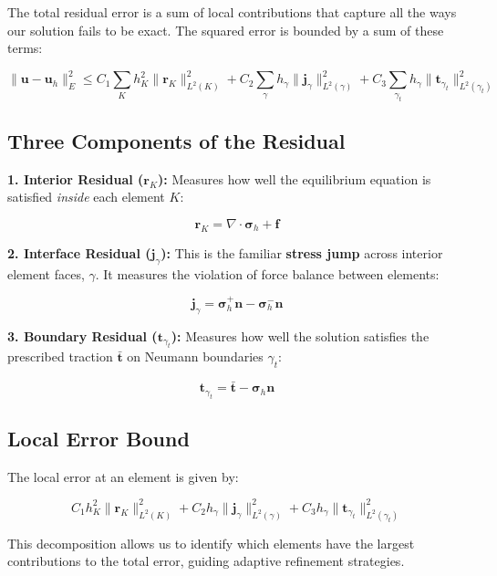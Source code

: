 \documentclass[
  11pt,
  a4paper,
]{scrbook}
\begin{document}
The total residual error is a sum of local contributions that capture
all the ways our solution fails to be exact. The squared error is
bounded by a sum of these terms:

\[\| \mathbf{u} - \mathbf{u}_h \|_E^2 \le C_1 \sum_{K} h_K^2 \| \mathbf{r}_K \|^2_{L^2(K)} + C_2 \sum_{\gamma} h_{\gamma} \| \mathbf{j}_{\gamma} \|^2_{L^2(\gamma)} +C_3 \sum_{\gamma_t} h_{\gamma} \| \mathbf{t}_{\gamma_t} \|^2_{L^2(\gamma_t)}\]

\subsection{Three Components of the
Residual}\label{three-components-of-the-residual}

\textbf{1. Interior Residual (\(\mathbf{r}_K\)):} Measures how well the
equilibrium equation is satisfied \emph{inside} each element \(K\):

\[\mathbf{r}_K = \nabla \cdot \boldsymbol{\sigma}_h + \mathbf{f}\]

\textbf{2. Interface Residual (\(\mathbf{j}_{\gamma}\)):} This is the
familiar \textbf{stress jump} across interior element faces, \(\gamma\).
It measures the violation of force balance between elements:

\[\mathbf{j}_{\gamma} = \boldsymbol{\sigma}_h^+ \mathbf{n} - \boldsymbol{\sigma}_h^- \mathbf{n}\]

\textbf{3. Boundary Residual (\(\mathbf{t}_{\gamma_t}\)):} Measures how
well the solution satisfies the prescribed traction \(\bar{\mathbf{t}}\)
on Neumann boundaries \(\gamma_t\):

\[\mathbf{t}_{\gamma_t} = \bar{\mathbf{t}} - \boldsymbol{\sigma}_h \mathbf{n}\]

\subsection{Local Error Bound}\label{local-error-bound}

The local error at an element is given by:

\[C_1  h_K^2 \| \mathbf{r}_K \|^2_{L^2(K)} + C_2 h_{\gamma} \| \mathbf{j}_{\gamma} \|^2_{L^2(\gamma)} +C_3 h_{\gamma} \| \mathbf{t}_{\gamma_t} \|^2_{L^2(\gamma_t)}\]

This decomposition allows us to identify which elements have the largest
contributions to the total error, guiding adaptive refinement
strategies.


\backmatter
\end{document}
